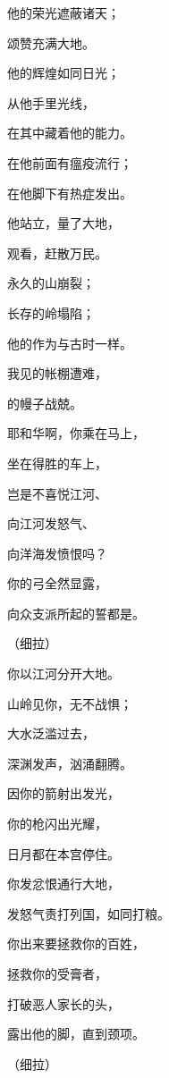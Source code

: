 {\Q 他的荣光遮蔽诸天；
\par }{\Q 颂赞充满大地。
\par }{\Q {}他的辉煌如同日光；
\par }{\Q 从他手里{}光线，
\par }{\Q 在其中藏着他的能力。
\par }{\Q {}在他前面有瘟疫流行；
\par }{\Q 在他脚下有热症发出。
\par }{\Q {}他站立，量了大地，
\par }{\Q 观看，赶散万民。
\par }{\Q 永久的山崩裂；
\par }{\Q 长存的岭塌陷；
\par }{\Q 他的作为与古时一样。
\par }{\BB \par }{\Q {}我见{}的帐棚遭难，
\par }{的幔子战兢。
\par }{\Q {}耶和华啊，你乘在马上，
\par }{\Q 坐在得胜的车上，
\par }{\Q 岂是不喜悦江河、
\par }{\Q 向江河发怒气、
\par }{\Q 向洋海发愤恨吗？
\par }{\Q {}你的弓全然显露，
\par }{\Q 向众支派所起的誓都是{}。
\par }{\QS （细拉）
\par }
{\Q 你以江河分开大地。
\par }{\Q {}山岭见你，无不战惧；
\par }{\Q 大水泛滥过去，
\par }{\Q 深渊发声，汹涌翻腾。
\par }{\Q {}因你的箭射出发光，
\par }{\Q 你的枪闪出光耀，
\par }{\Q 日月都在本宫停住。
\par }{\Q {}你发忿恨通行大地，
\par }{\Q 发怒气责打列国，如同打粮。
\par }{\Q {}你出来要拯救你的百姓，
\par }{\Q 拯救你的受膏者，
\par }{\Q 打破恶人家长的头，
\par }{\Q 露出他的脚，直到颈项。
\par }{\QS （细拉）
\par }
